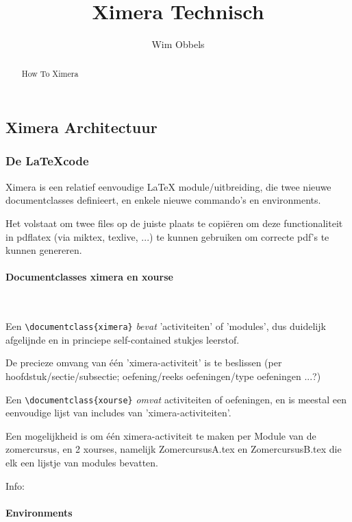 \documentclass{ximera}
\author{Wim Obbels}
\title{Ximera Technisch}
\begin{document}
\begin{abstract}
	How To Ximera
\end{abstract}
\maketitle


\subsection{Ximera Architectuur}

\subsubsection{De \LaTeX code}

Ximera is een relatief eenvoudige LaTeX module/uitbreiding, die twee nieuwe documentclasses definieert, en enkele nieuwe commando's en environments.

Het volstaat om twee files op de juiste plaats te copiëren om deze functionaliteit in pdflatex (via miktex, texlive, ...)  te kunnen gebruiken om correcte pdf's te kunnen genereren.


\paragraph{Documentclasses ximera en xourse} \ 

Een \verb|\documentclass{ximera}| \textit{bevat} 'activiteiten' of 'modules', dus duidelijk afgelijnde en in princiepe self-contained stukjes leerstof. 

De precieze omvang van één 'ximera-activiteit' is te beslissen (per hoofdstuk/sectie/subsectie; oefening/reeks oefeningen/type oefeningen ...?)

Een \verb|\documentclass{xourse}| \textit{omvat}  activiteiten of oefeningen, en is meestal een eenvoudige lijst van includes van 'ximera-activiteiten'. 

Een mogelijkheid is om één ximera-activiteit te maken per Module van de zomercursus, en 2 xourses, namelijk ZomercursusA.tex en ZomercursusB.tex die elk een lijstje van modules bevatten.


Info: 

\paragraph{Environments} \ 
\end{document}
